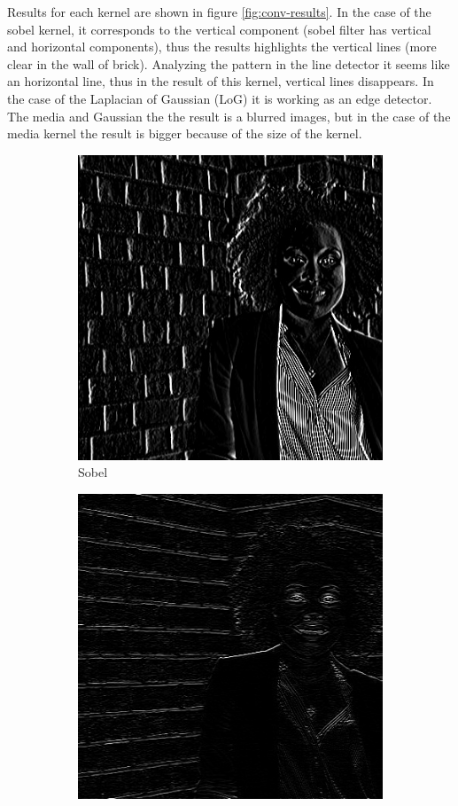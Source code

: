 Results for each kernel are shown in figure \ref{fig:conv-results}. In the case of the sobel kernel, it corresponds to the vertical component (sobel filter has vertical and horizontal components), thus the results highlights the vertical lines (more clear in the wall of brick). Analyzing the pattern in the line detector it seems like an horizontal line, thus in the result of this kernel, vertical lines disappears. In the case of the Laplacian of Gaussian (LoG) it is working as an edge detector. The media and Gaussian the the result is a blurred images, but in the case of the media kernel the result is bigger because of the size of the kernel.

\begin{figure}[h!]
\centering
\begin{subfigure}{0.3\textwidth}
  \centering
  \includegraphics[width=0.9\linewidth]{output/sobel.jpg}
  \caption{Sobel}
\end{subfigure}%
\begin{subfigure}{0.3\textwidth}
  \centering
  \includegraphics[width=0.9\linewidth]{output/horizontalLine.jpg}

\end{subfigure}
\end{figure}
